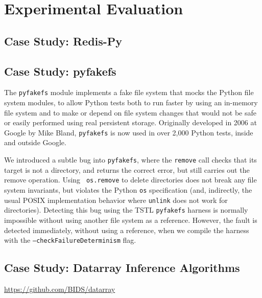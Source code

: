 \section{Experimental Evaluation}

\subsection {Case Study: Redis-Py}

\subsection {Case Study: pyfakefs}

The {\tt pyfakefs} \cite{pyfakefs} module implements a fake file
system that mocks the Python file system modules, to allow Python
tests both to run faster by using an in-memory file system and to make
or depend on file system changes that would
not be safe or easily performed using real persistent storage.  Originally
developed in 2006 at Google by Mike Bland, {\tt pyfakefs} is now used
in over 2,000 Python tests, inside and outside Google.

We introduced a subtle bug into {\tt pyfakefs}, where the {\tt remove}
call checks that its target is not a directory, and returns the
correct error, but still carries out the remove operation.  Using {\tt
  os.remove} to delete directories does not break any file system
invariants, but violates the Python {\tt os} specification (and,
indirectly, the usual POSIX implementation behavior where {\tt unlink}
does not work for directories).  Detecting this bug using the TSTL
{\tt pyfakefs} harness is normally impossible without using another
file system as a reference.  However, the fault is detected
immediately, without using a reference, when we compile the harness
with the {\tt --checkFailureDeterminism} flag.

\subsection{Case Study: Datarray Inference Algorithms}

\url{https://github.com/BIDS/datarray}

